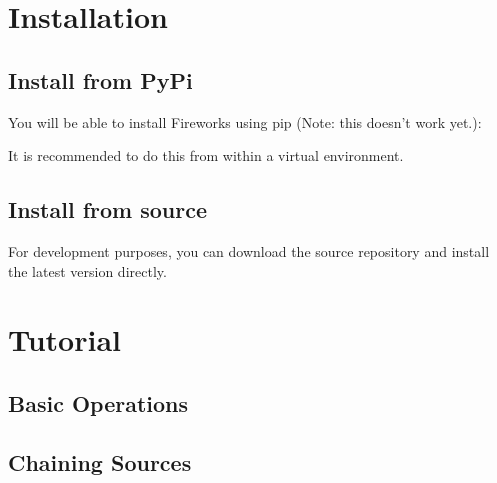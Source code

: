 \documentclass[letterpaper,10pt,english]{sphinxmanual}
\begin{document}
\section{Installation}
\label{\detokenize{Installation:installation}}\label{\detokenize{Installation::doc}}

\subsection{Install from PyPi}
\label{\detokenize{Installation:install-from-pypi}}
You will be able to install Fireworks using pip (Note: this doesn’t work yet.):

%
\begin{sphinxVerbatim}[commandchars=\\\{\}]
  
\end{sphinxVerbatim}

It is recommended to do this from within a virtual environment.


\subsection{Install from source}
\label{\detokenize{Installation:install-from-source}}
For development purposes, you can download the source repository and install the latest version directly.

%
\begin{sphinxVerbatim}[commandchars=\\\{\}]
  
 
  
\end{sphinxVerbatim}


\section{Tutorial}
\label{\detokenize{Tutorial:tutorial}}\label{\detokenize{Tutorial::doc}}

\subsection{Basic Operations}
\label{\detokenize{Tutorial:basic-operations}}

\subsection{Chaining Sources}
\label{\detokenize{Tutorial:chaining-sources}}
\end{document}
